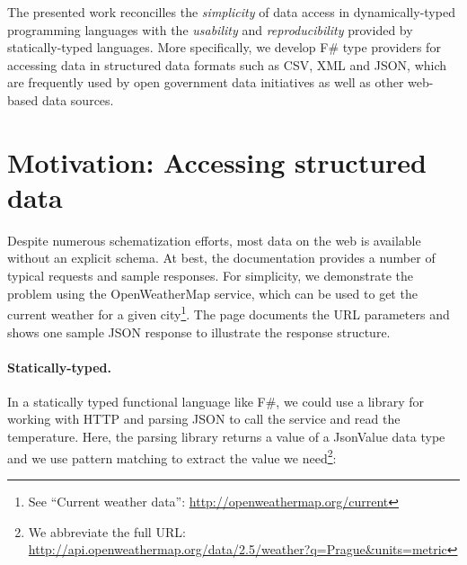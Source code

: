 \documentclass[preprint]{sigplanconf}
\newcommand{\ident}[1]{\textnormal{\sffamily #1}}
\begin{document}
\noindent
The presented work reconcilles the \emph{simplicity} of data access in dynamically-typed programming
languages with the \emph{usability} and \emph{reproducibility} provided by statically-typed
languages. More specifically, we develop F\# type providers for accessing data in structured
data formats such as CSV, XML and JSON, which are frequently used by open government data initiatives
as well as other web-based data sources.


\section{Motivation: Accessing structured data}

Despite numerous schematization efforts, most data on the web is available without an explicit
schema. At best, the documentation provides a number of typical requests and sample responses.
For simplicity, we demonstrate the problem using the OpenWeatherMap service, which can be used to get
the current weather for a given city\footnote{See ``Current weather data'': \url{http://openweathermap.org/current}}.
The page documents the URL parameters and shows one sample JSON response to illustrate the
response structure.

\paragraph{Statically-typed.}
In a statically typed functional language like F\#, we could use a library for working with HTTP
and parsing JSON to call the service and read the temperature. Here, the parsing library returns a
value of a \ident{JsonValue} data type and we use pattern matching to extract the value we
need\footnote{We abbreviate the full URL:
\url{http://api.openweathermap.org/data/2.5/weather?q=Prague\&units=metric}}:
\end{document}
